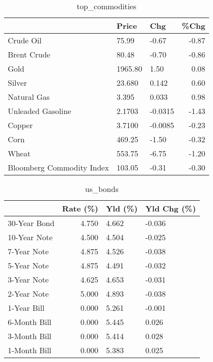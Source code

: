 \documentclass{article}%
\begin{document}
\begin{table}[htbp]%
\caption{top\_commodities}%
\centering%
\begin{adjustbox}{width=1\textwidth}%
\begin{tabular}{lllr}
\toprule
                          &   Price &     Chg &  \%Chg \\
\midrule
               Crude Oil  &   75.99 &   -0.67 & -0.87 \\
             Brent Crude  &   80.48 &   -0.70 & -0.86 \\
                    Gold  & 1965.80 &    1.50 &  0.08 \\
                  Silver  &  23.680 &   0.142 &  0.60 \\
             Natural Gas  &   3.395 &   0.033 &  0.98 \\
       Unleaded Gasoline  &  2.1703 & -0.0315 & -1.43 \\
                  Copper  &  3.7100 & -0.0085 & -0.23 \\
                    Corn  &  469.25 &   -1.50 & -0.32 \\
                   Wheat  &  553.75 &   -6.75 & -1.20 \\
Bloomberg Commodity Index &  103.05 &   -0.31 & -0.30 \\
\bottomrule
\end{tabular}
%
\end{adjustbox}%
\end{table}

%


\begin{table}[htbp]%
\caption{us\_bonds}%
\centering%
\begin{adjustbox}{width=1\textwidth}%
\begin{tabular}{lrll}
\toprule
             &  Rate (\%) & Yld (\%) & Yld Chg (\%) \\
\midrule
30-Year Bond &     4.750 &   4.662 &      -0.036 \\
10-Year Note &     4.500 &   4.504 &      -0.025 \\
 7-Year Note &     4.875 &   4.526 &      -0.038 \\
 5-Year Note &     4.875 &   4.491 &      -0.032 \\
 3-Year Note &     4.625 &   4.653 &      -0.031 \\
 2-Year Note &     5.000 &   4.893 &      -0.038 \\
 1-Year Bill &     0.000 &   5.261 &      -0.001 \\
6-Month Bill &     0.000 &   5.445 &       0.026 \\
3-Month Bill &     0.000 &   5.414 &       0.028 \\
1-Month Bill &     0.000 &   5.383 &       0.025 \\
\bottomrule
\end{tabular}
%
\end{adjustbox}%
\end{table}
\end{document}
